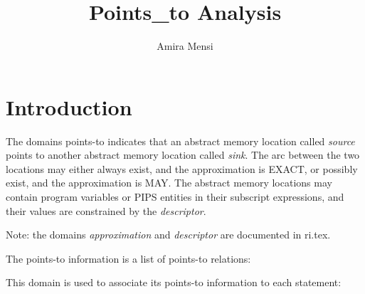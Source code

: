 \documentclass{article}
\title{Points\_to Analysis}
\author{Amira Mensi}
\begin{document}
\maketitle

\section{Introduction}

{}
{}
{}
{}
 


 
The domains points-to indicates that an abstract memory location
called {\em source} points to another abstract memory location called
{\em sink}. The arc between the two locations may either always exist,
and the approximation is EXACT, or possibly exist, and the
approximation is MAY. The abstract memory locations may contain
program variables or PIPS entities in their subscript expressions, and
their values are constrained by the {\em descriptor}.

{}
Note: the domains {\em approximation} and {\em descriptor} are
documented in ri.tex.


The points-to information is a list of points-to relations:
{}

This domain is used to associate its points-to information to each statement:
{}
\end{document}
